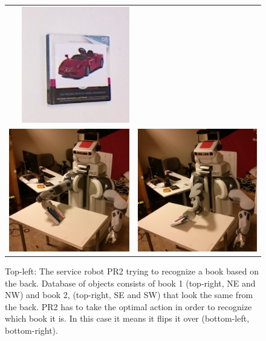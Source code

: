 \begin{figure}[ht]
\begin{tabular}{cccc}
    &\includegraphics[width=0.23\columnwidth]{pics/first_cover2.jpg} \\
    \multicolumn{2}{c}{\includegraphics[width=0.45\columnwidth]{pics/pr2_grasp.jpg}}
    & \multicolumn{2}{c}{\includegraphics[width=0.45\columnwidth]{pics/pr2_rotate.jpg}}
    \end{tabular}
    \caption{Top-left: The service robot PR2 trying to recognize a book based on the back. Database of objects consists of book 1 (top-right, NE and NW) and book 2, (top-right, SE and SW) that look the same from the back. PR2 has to take the optimal action in order to recognize which book it is. In this case it means it flips it over (bottom-left, bottom-right).}
    \label{fig:pr2}
    \end{figure}

